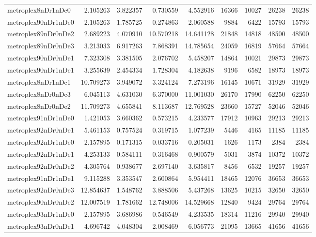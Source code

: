 \begin{longtable}{|l|r|r|r|r|r|r|r|r|}
metroplex8nDr1nDe0 & 2.105263 & 3.822357 & 0.730559 & 4.552916 & 16366 & 10027 & 26238 & 26238 \\
metroplex90nDr1nDe0 & 2.105263 & 1.785725 & 0.274863 & 2.060588 & 9884 & 6422 & 15793 & 15793 \\
metroplex89nDr0nDe2 & 2.689223 & 4.070910 & 10.570218 & 14.641128 & 21848 & 14818 & 48500 & 48500 \\
metroplex89nDr0nDe3 & 3.213033 & 6.917263 & 7.868391 & 14.785654 & 24059 & 16819 & 57664 & 57664 \\
metroplex90nDr0nDe1 & 7.323308 & 3.381505 & 2.076702 & 5.458207 & 14864 & 10021 & 29873 & 29873 \\
metroplex90nDr1nDe1 & 3.255639 & 2.454334 & 1.728304 & 4.182638 & 9196 & 6582 & 18973 & 18973 \\
metroplex8nDr1nDe1 & 10.709273 & 3.949072 & 3.324124 & 7.273196 & 16145 & 10671 & 31929 & 31929 \\
metroplex8nDr0nDe3 & 6.045113 & 4.631030 & 6.370000 & 11.001030 & 26170 & 17990 & 62250 & 62250 \\
metroplex8nDr0nDe2 & 11.709273 & 4.655841 & 8.113687 & 12.769528 & 23660 & 15727 & 52046 & 52046 \\
metroplex91nDr1nDe0 & 1.421053 & 3.660362 & 0.573215 & 4.233577 & 17912 & 10963 & 29213 & 29213 \\
metroplex92nDr0nDe1 & 5.461153 & 0.757524 & 0.319715 & 1.077239 & 5446 & 4165 & 11185 & 11185 \\
metroplex92nDr1nDe0 & 2.157895 & 0.171315 & 0.033716 & 0.205031 & 1626 & 1173 & 2384 & 2384 \\
metroplex92nDr1nDe1 & 4.253133 & 0.584111 & 0.316468 & 0.900579 & 5031 & 3874 & 10372 & 10372 \\
metroplex92nDr0nDe2 & 4.305764 & 0.938677 & 2.697140 & 3.635817 & 8456 & 6532 & 19257 & 19257 \\
metroplex91nDr1nDe1 & 9.115288 & 3.353547 & 2.600864 & 5.954411 & 18465 & 12076 & 36653 & 36653 \\
metroplex92nDr0nDe3 & 12.854637 & 1.548762 & 3.888506 & 5.437268 & 13625 & 10215 & 32650 & 32650 \\
metroplex90nDr0nDe2 & 12.007519 & 1.781662 & 12.748006 & 14.529668 & 12840 & 9424 & 29764 & 29764 \\
metroplex93nDr1nDe0 & 2.157895 & 3.686986 & 0.546549 & 4.233535 & 18314 & 11216 & 29940 & 29940 \\
metroplex93nDr0nDe1 & 4.696742 & 4.048304 & 2.008469 & 6.056773 & 21095 & 13665 & 41656 & 41656 \\

\end{longtable}
